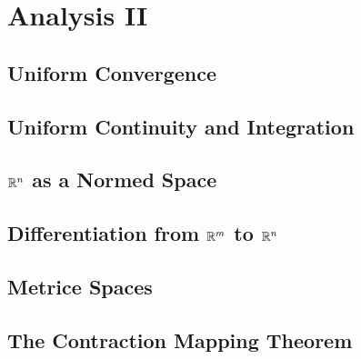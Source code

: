 \documentclass[main.tex]{subfiles}
\begin{document}
\chapter{Analysis II}
	\section{Uniform Convergence}
	
	\section{Uniform Continuity and Integration}
	
	\section{$\mathbb R^n$ as a Normed Space}
	
	\section{Differentiation from $\mathbb R^m$ to $\mathbb R^n$}
	
	\section{Metrice Spaces}
	
	\section{The Contraction Mapping Theorem}
				
\end{document}
